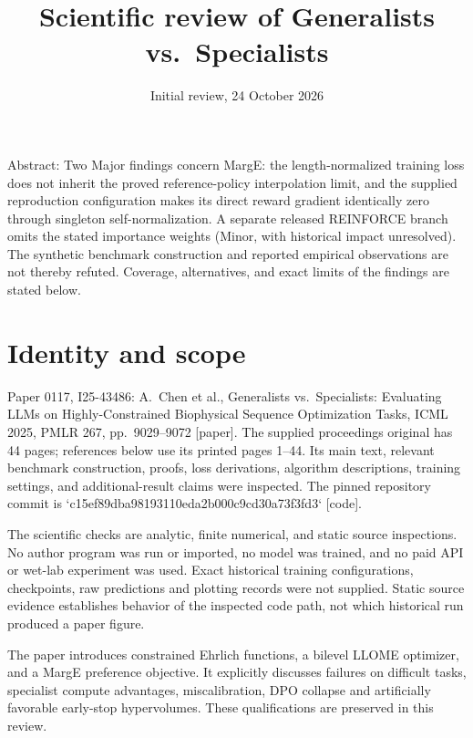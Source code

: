 \documentclass[10pt]{article}
\title{Scientific review of Generalists vs. Specialists}
\author{}
\date{Initial review, 24 October 2026}
\begin{document}
\maketitle
Abstract: Two Major findings concern MargE: the length-normalized training loss does not inherit the proved reference-policy interpolation limit, and the supplied reproduction configuration makes its direct reward gradient identically zero through singleton self-normalization. A separate released REINFORCE branch omits the stated importance weights (Minor, with historical impact unresolved). The synthetic benchmark construction and reported empirical observations are not thereby refuted. Coverage, alternatives, and exact limits of the findings are stated below.\par
\section*{Identity and scope}
Paper 0117, I25-43486: A. Chen et al., Generalists vs. Specialists: Evaluating LLMs on Highly-Constrained Biophysical Sequence Optimization Tasks, ICML 2025, PMLR 267, pp. 9029–9072 [paper]. The supplied proceedings original has 44 pages; references below use its printed pages 1–44. Its main text, relevant benchmark construction, proofs, loss derivations, algorithm descriptions, training settings, and additional-result claims were inspected. The pinned repository commit is `c15ef89dba98193110eda2b000c9cd30a73f3fd3` [code].\par
The scientific checks are analytic, finite numerical, and static source inspections. No author program was run or imported, no model was trained, and no paid API or wet-lab experiment was used. Exact historical training configurations, checkpoints, raw predictions and plotting records were not supplied. Static source evidence establishes behavior of the inspected code path, not which historical run produced a paper figure.\par
The paper introduces constrained Ehrlich functions, a bilevel LLOME optimizer, and a MargE preference objective. It explicitly discusses failures on difficult tasks, specialist compute advantages, miscalibration, DPO collapse and artificially favorable early-stop hypervolumes. These qualifications are preserved in this review.\par
\end{document}
